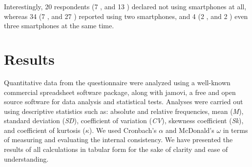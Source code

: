 \documentclass[preprint,12pt]{elsarticle}
\begin{document}
Interestingly, 20 respondents (7 \female, and 13 \male) declared not using smartphones at all, whereas 34 (7 \female, and 27 \male) reported using two smartphones, and 4 (2 \female, and 2 \male) even three smartphones at the same time.

\section{Results}
Quantitative data from the questionnaire were analyzed using a well-known commercial spreadsheet software package, along with jamovi, a free and open source software for data analysis and statistical tests. Analyses were carried out using descriptive statistics such as: absolute and relative frequencies, mean (\textit{M}), standard deviation (\textit{SD}), coefficient of variation (\textit{CV}), skewness coefficient (\textit{Sk}), and coefficient of kurtosis ($\kappa$). We used Cronbach's $\alpha$ and McDonald's $\omega$ in terms of measuring and evaluating the internal consistency. We have presented the results of all calculations in tabular form for the sake of clarity and ease of understanding.
\end{document}
